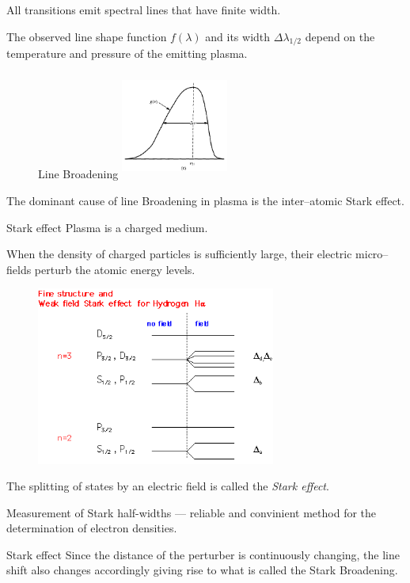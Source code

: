 \documentclass[final]{beamer}
\begin{document}
\begin{frame}
  All transitions emit spectral lines that have finite width.
  
  The observed line shape function $f(\lambda)$ and its width $\Delta \lambda_{1/2}$ depend on the temperature and pressure of the emitting plasma.
\begin{figure}{Line Broadening}
  \includegraphics[width=100pt,height=100pt]{figures/lineshape.PNG}
\end{figure}
The dominant cause of line Broadening in plasma is the inter--atomic Stark effect.
\end{frame}
\begin{frame}{Stark effect}
  Plasma is a charged medium.

  When the density of charged particles is sufficiently large, their electric micro--fields perturb the atomic energy levels.
  \begin{figure}
      \includegraphics[width=0.7\textwidth]{figures/stark_effect_1.png}
  \end{figure}
  The splitting of states by an electric field is called the \emph{Stark effect}.

  Measurement of Stark half-widths --- reliable and convinient method for the determination of electron densities.
  \end{frame}
  \begin{frame}{Stark effect}
    Since the distance of the perturber is continuously changing, the line shift also changes accordingly giving rise to what is called the Stark Broadening.
    \begin{figure}
    
    \end{figure}
  \end{frame}
\end{document}
